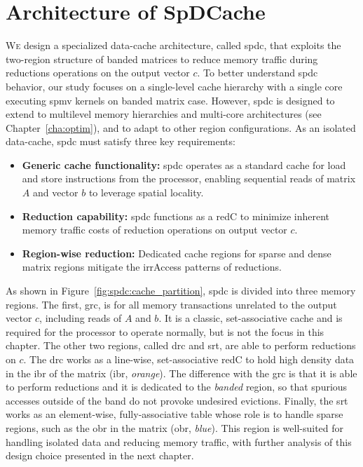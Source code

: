 
\section{Architecture of SpDCache}
\label{sec:spdc:archispdc}

\lettrine{W}{e} design a specialized data-cache architecture, called \acrlong{spdc}, that exploits the two-region structure of \gls{banded} matrices to reduce memory traffic during \glspl{reduction} operations on the output vector $c$.
To better understand \acrlong{spdc} behavior, our study focuses on a single-level cache hierarchy with a single core executing \acrshort{spmv} kernels on \gls{banded} matrix case.
However, \acrlong{spdc} is designed to extend to multilevel memory hierarchies and multi-core architectures (see Chapter~\ref{cha:optim}), and to adapt to other region configurations.
As an isolated data-cache, \acrlong{spdc} must satisfy three key requirements:
\begin{itemize}
    \item \textbf{Generic cache functionality:} \acrlong{spdc} operates as a standard cache for load and store instructions from the processor, enabling sequential reads of matrix $A$ and vector $b$ to leverage spatial locality.
    \item \textbf{Reduction capability:} \acrlong{spdc} functions as a \gls{redC} to minimize inherent memory traffic costs of \gls{reduction} operations on output vector $c$.
    \item \textbf{Region-wise reduction:} Dedicated cache regions for sparse and dense matrix regions mitigate the \gls{irrAccess} patterns of \glspl{reduction}.
\end{itemize}

As shown in Figure~\ref{fig:spdc:cache_partition}, \acrlong{spdc} is divided into three memory regions.
The first, \acrfull{grc}, is for all memory transactions unrelated to the output vector $c$, including reads of $A$ and $b$.
It is a classic, \gls{set}-associative cache and is required for the processor to operate normally, but is not the focus in this chapter.
The other two regions, called \acrfull{drc} and \acrfull{srt}, are able to perform \glspl{reduction} on $c$.
The \acrshort{drc} works as a line-wise, \gls{set}-associative \gls{redC} to hold high density data in the \acrlong{ibr} of the matrix (\acrshort{ibr}, \textit{orange}).
The difference with the \acrshort{grc} is that it is able to perform \glspl{reduction} and it is dedicated to the \emph{banded} region, so that spurious accesses outside of the \gls{band} do not provoke undesired \glspl{eviction}.
Finally, the \acrshort{srt} works as an element-wise, fully-associative table whose role is to handle sparse regions, such as the \acrlong{obr} in the matrix (\acrshort{obr}, \textit{blue}).
This region is well-suited for handling isolated data and reducing memory traffic, with further analysis of this design choice presented in the next chapter.

